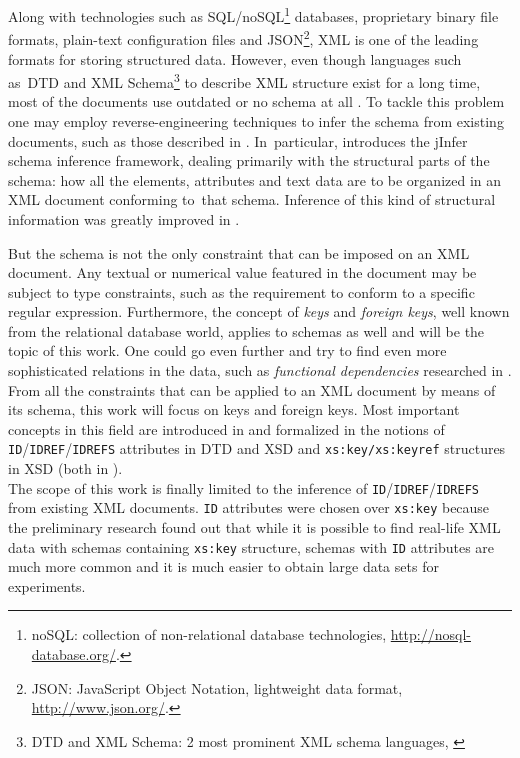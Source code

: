 \label{chapter-preface}

Along with technologies such as SQL/noSQL\footnote{noSQL: collection of non-relational database technologies, \url{http://nosql-database.org/}.} databases, proprietary binary file formats, plain-text configuration files and JSON\footnote{JSON: JavaScript Object Notation, lightweight data format, \url{http://www.json.org/}.}, XML is one of the leading formats for storing structured data. However, even though languages such as~DTD and XML Schema\footnote{DTD and XML Schema: 2 most prominent XML schema languages, \cite{Bray:08:EML}} to describe XML structure exist for a long time, most of the documents use outdated or no schema at all \cite{1802522}. To tackle this problem one may employ reverse-engineering techniques to infer the schema from existing documents, such as those described in \cite{ahonen, bex, vyhnanovska}. In~particular, \cite{archdoc} introduces the jInfer schema inference framework, dealing primarily with the structural parts of the schema: how all the elements, attributes and text data are to be organized in an XML document conforming to~that schema. Inference of this kind of structural information was greatly improved in \cite{anti}.\\


But the schema is not the only constraint that can be imposed on an XML document. Any textual or numerical value featured in the document may be subject to type constraints, such as the requirement to conform to a specific regular expression. Furthermore, the concept of \textit{keys} and \textit{foreign keys}, well known from the relational database world, applies to schemas as well and will be the topic of this work. One could go even further and try to find even more sophisticated relations in the data, such as \textit{functional dependencies} researched in \cite{sviro}.\\

From all the constraints that can be applied to an XML document by means of its schema, this work will focus on keys and foreign keys. Most important concepts in this field are introduced in \cite{keX} and formalized in the notions of \texttt{ID}/\.\texttt{IDREF}/\.\texttt{IDREFS} attributes in DTD and XSD and \texttt{xs:key/xs:keyref} structures in XSD (both in \cite{Bray:08:EML}).\\

The scope of this work is finally limited to the inference of \texttt{ID}/\.\texttt{IDREF}/\.\texttt{IDREFS} from existing XML documents. \texttt{ID} attributes were chosen over \texttt{xs:key} because the preliminary research found out that while it is possible to find real-life XML data with schemas containing \texttt{xs:key} structure, schemas with \texttt{ID} attributes are much more common and it is much easier to obtain large data sets for experiments.

